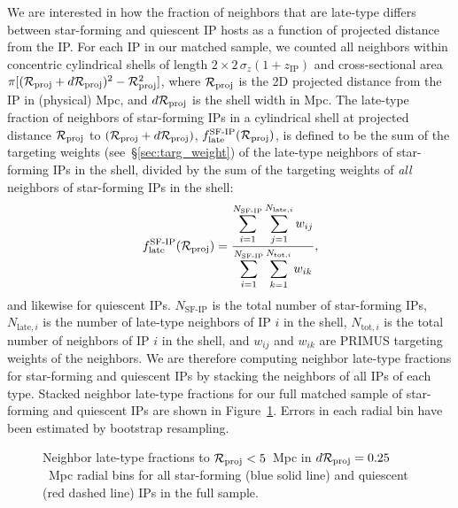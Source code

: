 We are interested in how the fraction of neighbors that are late-type differs between star-forming and quiescent IP hosts as a function of projected distance from the IP.
For each IP in our matched sample, we counted all neighbors within concentric cylindrical shells of length $2\times2\,\sigma_{z}(1+z_{\text{IP}})$ and cross-sectional area
$\pi[(\mathcal{R}_{\text{proj}}+d\mathcal{R}_{\text{proj}})^ 2-\mathcal{R}_{\text{proj}}^2]$, where $\mathcal{R}_{\text{proj}}$ is the 2D projected distance from the IP in (physical) Mpc, and $d\mathcal{R}_{\text{proj}}$ is the shell width in Mpc.
The late-type fraction of neighbors of star-forming IPs in a cylindrical shell at projected distance $\mathcal{R}_{\text{proj}}$ to ${(\mathcal{R}_{\text{proj}}+d\mathcal{R}_{\text{proj}})}$, $f^{\textrm{SF-IP}}_{\textrm{late}}
(\mathcal{R}_{\text{proj}})$, is defined to be the sum of the targeting weights (see~\S\ref{sec:targ_weight}) of the late-type neighbors of star-forming IPs in the shell, divided by the sum of the
targeting weights of \emph{all} neighbors of star-forming IPs in the shell:
\begin{equation}
        f^{\textrm{SF-IP}}_{\textrm{late}}(\Rproj) = \frac
        {\displaystyle \sum_{i=1}^{N_{\textrm{SF-IP}}} \sum_{j=1}^{N_{\textrm{late},i}} w_{ij} }
        {\displaystyle \sum_{i=1}^{N_{\textrm{SF-IP}}} \sum_{k=1}^{N_{\textrm{tot},i}} w_{ik} }, \nonumber
\end{equation}
and likewise for quiescent IPs.
$N_{\textrm{SF-IP}}$ is the total number of star-forming IPs, $N_{\textrm{late},i}$ is the number of late-type neighbors of IP $i$ in the shell, $N_{\textrm{tot},i}$ is the
total number of neighbors of IP $i$ in the shell, and $w_{ij}$ and $w_{ik}$ are PRIMUS targeting weights of the neighbors.  We are therefore computing neighbor late-type fractions for star-forming and quiescent IPs by stacking the neighbors of all IPs of each type.
Stacked neighbor late-type fractions for our full matched sample of star-forming and quiescent IPs are shown in Figure~\ref{fig:latefrac_full}.  Errors in each radial bin have been estimated by bootstrap resampling.

\begin{figure}
  \epstrim{0.4in 0.1in 0.3in 0.4in}
  \caption{Neighbor late-type fractions to {$\mathcal{R}_{\text{proj}}<5$~Mpc} in {$d\mathcal{R}_{\text{proj}}=0.25$~Mpc} radial bins for all star-forming (blue solid line) and quiescent (red dashed line) IPs in the full sample.
}
  \label{fig:latefrac_full}
\end{figure}

